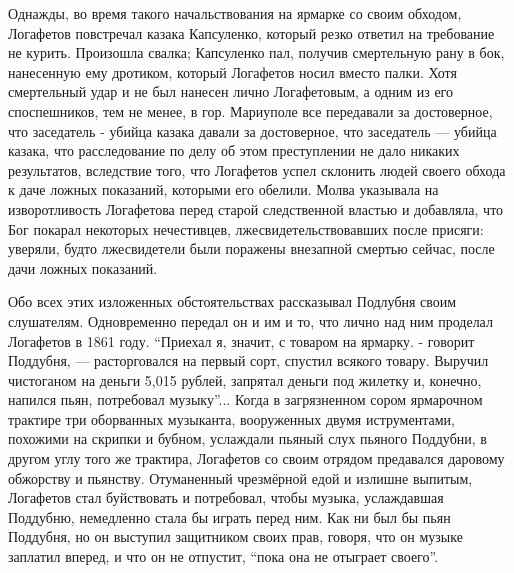 \documentclass[a4paper,20pt]{article}
\begin{document}
Однажды, во время такого начальствования на ярмарке со своим обходом, Логафетов повстречал казака
Капсуленко, который резко ответил на требование не курить.
Произошла свалка; Капсуленко пал, получив смертельную рану в бок, нанесенную ему дротиком,
который Логафетов носил вместо палки. Хотя смертельный удар и не был нанесен лично
Логафетовым, а одним из его споспешников, тем не менее, в гор. Мариуполе
все передавали за достоверное, что заседатель - убийца казака
давали за достоверное, что заседатель — убийца казака, что
расследование по делу об этом преступлении не дало никаких результатов, вследствие того, что
Логафетов успел склонить людей своего обхода к даче ложных показаний, которыми его обелили.
Молва указывала на изворотливость Логафетова перед старой следственной властью и добавляла, что Бог
покарал некоторых нечестивцев, лжесвидетельствовавших после присяги: уверяли, будто
лжесвидетели были поражены внезапной смертью сейчас,
после дачи ложных показаний.

Обо всех этих изложенных обстоятельствах рассказывал Подлубня своим слушателям. 
Одновременно передал он и им и то, что лично над ним проделал Логафетов в 1861 году.
``Приехал я, значит, с товаром на ярмарку. - 
говорит Поддубня, — расторговался на первый сорт,
спустил всякого товару. Выручил чистоганом на деньги
5,015 рублей, запрятал деньги под жилетку и, конечно,
напился пьян, потребовал музыку''...
Когда в загрязненном сором ярмарочном трактире три оборванных музыканта,
вооруженных двумя иструментами, похожими на скрипки и бубном, услаждали пьяный
слух пьяного Поддубни, в другом углу того же трактира, Логафетов со своим
отрядом предавался даровому обжорству и пьянству. Отуманенный чрезмёрной едой и
излишне выпитым, Логафетов стал буйствовать и потребовал, чтобы музыка,
услаждавшая Поддубню, немедленно стала бы играть перед ним. Как ни был бы пьян
Поддубня, но он выступил защитником своих прав, говоря, что он музыке заплатил
вперед, и что он не отпустит, ``пока она не отыграет своего''.
\end{document}
